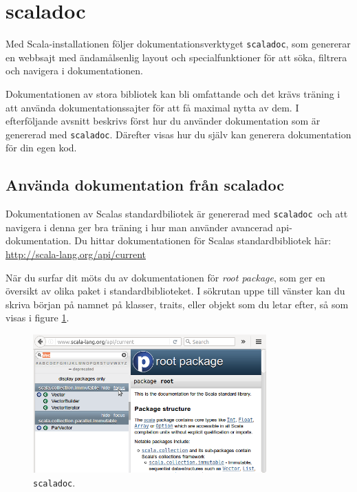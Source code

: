 \section{scaladoc}
\newcommand{\scaladoc}{\texttt{scaladoc}}

Med Scala-installationen följer dokumentationsverktyget \scaladoc, som genererar en webbsajt med ändamålsenlig layout och specialfunktioner för att söka, filtrera och navigera i dokumentationen. 

Dokumentationen av stora bibliotek kan bli omfattande och det krävs träning i att använda dokumentationssajter för att få maximal nytta av dem. I efterföljande avsnitt beskrivs först hur du använder dokumentation som är genererad med \scaladoc. Därefter visas hur du själv kan generera dokumentation för din egen kod.


\subsection{Använda dokumentation från scaladoc}

Dokumentationen av Scalas standardbiliotek är genererad med \scaladoc\ och att navigera i denna ger bra träning i hur man använder avancerad api-dokumentation. Du hittar dokumentationen för Scalas standardbibliotek här: \\
\url{http://scala-lang.org/api/current} 


När du surfar dit möts du av dokumentationen för \textit{root package}, som ger en översikt av olika paket i standardbiblioteket. I sökrutan uppe till vänster kan du skriva början på namnet på klasser, traits, eller objekt som du letar efter, så som visas i figure \ref{fig:scaladoc:root-package}.

\begin{figure}[H]
\centering
\includegraphics[width=0.8\textwidth]{../img/scaladoc/scaladoc-root}

     \caption{ \scaladoc.}
    \label{fig:scaladoc:root-package}
\end{figure}


